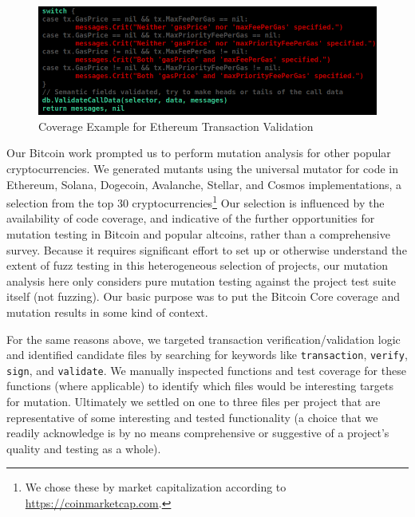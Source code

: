 \begin{figure}
\vspace{2mm}
\includegraphics[width=0.9\columnwidth]{coverage-example.png}
\caption{Coverage Example for Ethereum Transaction Validation}
\label{fig:coverage}
\end{figure}

Our Bitcoin work prompted us to perform mutation analysis for other popular cryptocurrencies.
We generated mutants using the universal mutator for code in Ethereum, Solana,
Dogecoin, Avalanche, Stellar, and Cosmos implementations, a selection from the top 30
cryptocurrencies\footnote{We chose these by market capitalization according to
\url{https://coinmarketcap.com}.} Our selection is influenced by the
availability of code coverage, and indicative of the further opportunities for
mutation testing in Bitcoin and popular altcoins, rather than a
comprehensive survey. Because it requires significant effort to set up or
otherwise understand the extent of fuzz testing in this heterogeneous selection
of projects, our mutation analysis here only considers pure mutation testing
against the project test suite itself (not fuzzing).  Our basic
purpose was to put the Bitcoin Core coverage and mutation results in
some kind of context.

For the same reasons above, we targeted transaction verification/validation logic and
identified candidate files by searching for keywords like \texttt{transaction},
\texttt{verify}, \texttt{sign}, and \texttt{validate}. We manually inspected
functions and test coverage for these functions (where applicable) to identify
which files would be interesting targets for mutation. Ultimately we
settled on one to three files per project that are representative of some
interesting and tested functionality (a choice that we readily acknowledge is by
no means comprehensive or suggestive of a project's quality and testing as a
whole).

